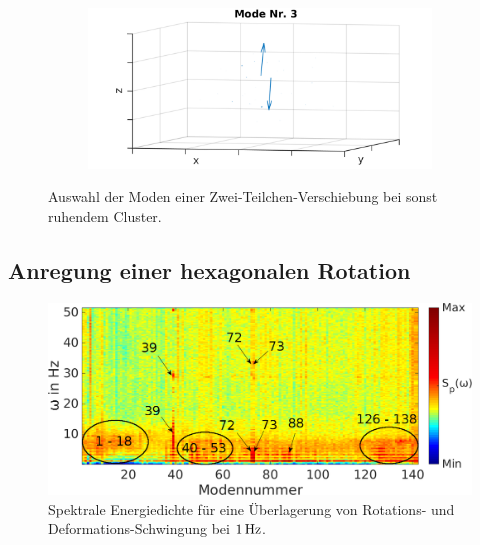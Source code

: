 \begin{figure}[!t]
\begin{subfigure}[t]{0.325\textwidth}
                \includegraphics[width=\textwidth,height=0.7\textwidth]{figs/auswertung/manipulation/dipol3HzModeNr3.png}
              \end{subfigure}
              \caption{Auswahl der Moden einer Zwei-Teilchen-Verschiebung bei sonst ruhendem Cluster.}\label{img:modendipol3Hz}
            \end{figure}

          \subsection*{Anregung einer hexagonalen Rotation}

              \begin{figure}[!b]
                \centering
                \includegraphics[width=\textwidth]{figs/auswertung/manipulation/rotdipol1Hzpowerdens.png}
                \caption{Spektrale Energiedichte für eine Überlagerung von Rotations- und Deformations-Schwingung bei $\unit[1]{Hz}$.}\label{img:rotdipol1Hzpowerdens}
              \end{figure}

